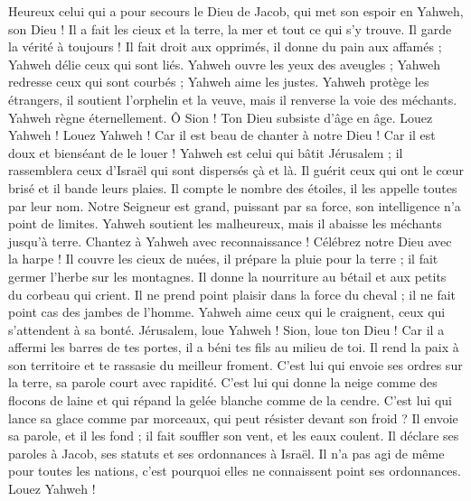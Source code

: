 \begin{multicols}{2}
Heureux celui qui a pour secours le Dieu de Jacob, qui met son espoir en Yahweh, son Dieu !
Il a fait les cieux et la terre, la mer et tout ce qui s'y trouve. Il garde la vérité à toujours !
Il fait droit aux opprimés, il donne du pain aux affamés ; Yahweh délie ceux qui sont liés.
Yahweh ouvre les yeux des aveugles ; Yahweh redresse ceux qui sont courbés ; Yahweh aime les justes.
Yahweh protège les étrangers, il soutient l'orphelin et la veuve, mais il renverse la voie des méchants.
Yahweh règne éternellement. Ô Sion ! Ton Dieu subsiste d'âge en âge. Louez Yahweh !
\VerseOne{}Louez Yahweh ! Car il est beau de chanter à notre Dieu ! Car il est doux et bienséant de le louer !
Yahweh est celui qui bâtit Jérusalem ; il rassemblera ceux d'Israël qui sont dispersés çà et là.
Il guérit ceux qui ont le cœur brisé et il bande leurs plaies.
Il compte le nombre des étoiles, il les appelle toutes par leur nom.
Notre Seigneur est grand, puissant par sa force, son intelligence n'a point de limites.
Yahweh soutient les malheureux, mais il abaisse les méchants jusqu'à terre.
Chantez à Yahweh avec reconnaissance ! Célébrez notre Dieu avec la harpe !
Il couvre les cieux de nuées, il prépare la pluie pour la terre ; il fait germer l'herbe sur les montagnes.
Il donne la nourriture au bétail et aux petits du corbeau qui crient.
Il ne prend point plaisir dans la force du cheval ; il ne fait point cas des jambes de l'homme.
Yahweh aime ceux qui le craignent, ceux qui s'attendent à sa bonté.
Jérusalem, loue Yahweh ! Sion, loue ton Dieu !
Car il a affermi les barres de tes portes, il a béni tes fils au milieu de toi.
Il rend la paix à son territoire et te rassasie du meilleur froment.
C'est lui qui envoie ses ordres sur la terre, sa parole court avec rapidité.
C'est lui qui donne la neige comme des flocons de laine et qui répand la gelée blanche comme de la cendre.
C'est lui qui lance sa glace comme par morceaux, qui peut résister devant son froid ?
Il envoie sa parole, et il les fond ; il fait souffler son vent, et les eaux coulent.
Il déclare ses paroles à Jacob, ses statuts et ses ordonnances à Israël.
Il n'a pas agi de même pour toutes les nations, c'est pourquoi elles ne connaissent point ses ordonnances. Louez Yahweh !

\end{multicols}
